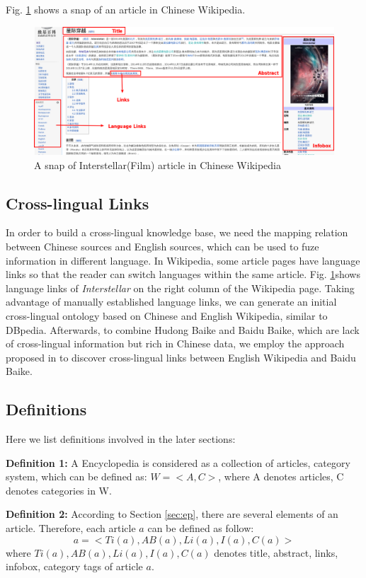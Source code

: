 \documentclass[runningheads,a4paper]{llncs}
\begin{document}
Fig. \ref{fig:interstellar} shows a snap of an article in Chinese Wikipedia.
\begin{figure}[ht]
    \centerline{\includegraphics[width=1\columnwidth]{fig/interstellar}}
    \label{fig:interstellar}
    \caption{A snap of Interstellar(Film) article in Chinese Wikipedia}
\end{figure}%

\subsection{Cross-lingual Links}
In order to build a cross-lingual knowledge base, we need the mapping relation between Chinese sources and English sources, which can be used to fuze information in different language. In Wikipedia, some article pages have language links so that the reader can switch languages within the same article. Fig. \ref{fig:interstellar}shows language links of \emph{Interstellar} on the right column of the Wikipedia page. Taking advantage of manually established language links, we can generate an initial cross-lingual ontology based on Chinese and English Wikipedia, similar to DBpedia. Afterwards, to combine Hudong Baike and Baidu Baike, which are lack of cross-lingual information but rich in Chinese data, we employ the approach proposed in \cite{wang2012cross} to discover cross-lingual links between English Wikipedia and Baidu Baike.

\subsection{Definitions}
\label{sec:definition}
Here we list definitions involved in the later sections:

\textbf{Definition 1:} A Encyclopedia is considered as a collection of articles, category system, which can be defined as: $W = <A,C>$, where A denotes articles, C denotes categories in W.

\textbf{Definition 2:} According to Section \ref{sec:ep}, there are several elements of an article. Therefore, each article $a$ can be defined as follow:
\begin{equation}
    a = <Ti(a),AB(a),Li(a),I(a),C(a)>
\end{equation}
where $Ti(a),AB(a),Li(a),I(a),C(a)$ denotes title, abstract, links, infobox, category tags of article $a$.
\end{document}
